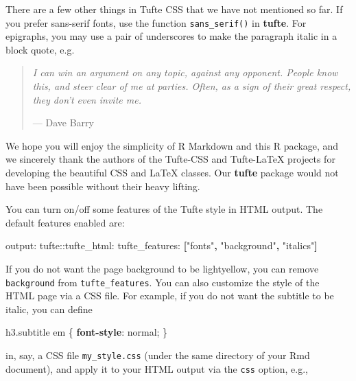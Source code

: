 \documentclass[]{tufte-handout}
\newenvironment{Shaded}{}{}
\newcommand{\AttributeTok}[1]{\textcolor[rgb]{0.49,0.56,0.16}{#1}}
\newcommand{\DecValTok}[1]{\textcolor[rgb]{0.25,0.63,0.44}{#1}}
\newcommand{\FunctionTok}[1]{\textcolor[rgb]{0.02,0.16,0.49}{#1}}
\newcommand{\KeywordTok}[1]{\textcolor[rgb]{0.00,0.44,0.13}{\textbf{#1}}}
\newcommand{\NormalTok}[1]{#1}
\newcommand{\StringTok}[1]{\textcolor[rgb]{0.25,0.44,0.63}{#1}}
\begin{document}
There are a few other things in Tufte CSS that we have not mentioned so
far. If you prefer \textsf{sans-serif fonts}, use the function
\texttt{sans\_serif()} in \textbf{tufte}. For epigraphs, you may use a
pair of underscores to make the paragraph italic in a block quote, e.g.

\begin{quote}
\emph{I can win an argument on any topic, against any opponent. People
know this, and steer clear of me at parties. Often, as a sign of their
great respect, they don't even invite me.}

\hfill --- Dave Barry
\end{quote}

We hope you will enjoy the simplicity of R Markdown and this R package,
and we sincerely thank the authors of the Tufte-CSS and Tufte-LaTeX
projects for developing the beautiful CSS and LaTeX classes. Our
\textbf{tufte} package would not have been possible without their heavy
lifting.

You can turn on/off some features of the Tufte style in HTML output. The
default features enabled are:

\begin{Shaded}
\begin{Highlighting}[]
\FunctionTok{output:}
  \FunctionTok{tufte:}\AttributeTok{:tufte_html:}
    \FunctionTok{tufte_features:}\AttributeTok{ }\KeywordTok{[}\StringTok{"fonts"}\KeywordTok{,} \StringTok{"background"}\KeywordTok{,} \StringTok{"italics"}\KeywordTok{]}
\end{Highlighting}
\end{Shaded}

If you do not want the page background to be lightyellow, you can remove
\texttt{background} from \texttt{tufte\_features}. You can also
customize the style of the HTML page via a CSS file. For example, if you
do not want the subtitle to be italic, you can define

\begin{Shaded}
\begin{Highlighting}[]
\NormalTok{h3}\FunctionTok{.subtitle}\NormalTok{ em \{}
  \KeywordTok{font-style}\NormalTok{: }\DecValTok{normal}\NormalTok{;}
\NormalTok{\}}
\end{Highlighting}
\end{Shaded}

in, say, a CSS file \texttt{my\_style.css} (under the same directory of
your Rmd document), and apply it to your HTML output via the
\texttt{css} option, e.g.,
\end{document}

